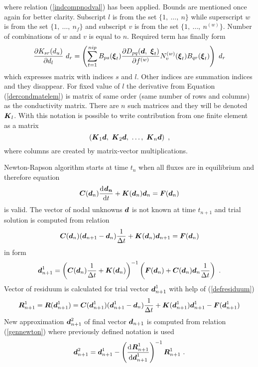 \documentclass[12pt]{book}
\newcommand{\mbf}[1]{\mbox{\boldmath$#1$}}
\newcommand{\del}[2]{\mbox{$\displaystyle\frac{#1}{#2}$}}
\newcommand{\ppd}[2]{\del{\partial{#1}}{\partial{#2}}}
\newcommand{\od}[2]{\del{{\rm d}\>\!{#1}}{{\rm d}{#2}}}
\begin{document}
where relation (\ref{indcompnodval}) has been applied. Bounds are mentioned once again for better clarity. Subscript $l$ is
from the set $\{1,\ \ldots,\ n\}$ while superscript $w$ is from the set $\{1,\ \ldots,\ n_f\}$ and subscript $v$ is from
the set $\{1,\ \ldots,\ n^{(w)}\}$. Number of combinations of $w$ and $v$ is equal to $n$.
Required term has finally form
\begin{eqnarray}
\ppd{K_{sr}(d_u)}{d_l}\ d_r =
\left(\sum_{t=1}^{nip} B_{ps}(\mbf{\xi}_{t}) \ppd{D_{pq}(\mbf{d},\ \mbf{\xi}_{t})}{f^{(w)}}
N^{(w)}_{v}(\mbf{\xi}_{t}) B_{qr}(\mbf{\xi}_{t})\right)\ d_r
\end{eqnarray}
which expresses matrix with indices $s$ and $l$. Other indices are summation indices and they disappear.
For fixed value of $l$ the derivative from Equation (\ref{dercondmatelem}) is matrix of same order
(same number of rows and columns) as the conductivity matrix. There are $n$ such matrices and they will be denoted
$\mbf{K}_{l}$. With this notation is possible to write contribution from one finite element as a matrix
\begin{equation}
\left(\mbf{K}_{1} \mbf{d},\ \mbf{K}_{2} \mbf{d},\ \ldots,\ \mbf{K}_{n} \mbf{d}\right)\ ,
\end{equation}
where columns are created by matrix-vector multiplications.

Newton-Rapson algorithm starts at time $t_n$ when all fluxes are in equilibrium and therefore equation
\begin{equation}
\mbf{C}(\mbf{d}_{n}) \od{\mbf{d_{n}}}{t} + \mbf{K}(\mbf{d}_{n}) \mbf{d}_{n} = \mbf{F}(\mbf{d}_{n})
\end{equation}
is valid. The vector of nodal unknowns $\mbf{d}$ is not known at time $t_{n+1}$ and trial solution
is computed from relation
\begin{equation}
\mbf{C}(\mbf{d}_{n}) (\mbf{d}_{n+1} - \mbf{d}_{n})\del{1}{\Delta t} + \mbf{K}(\mbf{d}_{n}) \mbf{d}_{n+1} = \mbf{F}(\mbf{d}_{n})
\end{equation}
in form
\begin{equation}
\mbf{d}_{n+1}^{1} = \left(\mbf{C}(\mbf{d}_{n}) \del{1}{\Delta t} + \mbf{K}(\mbf{d}_{n})\right)^{-1} 
\left(\mbf{F}(\mbf{d}_{n}) + \mbf{C}(\mbf{d}_{n})\mbf{d}_{n}\del{1}{\Delta t}\right)\ .
\end{equation}
Vector of residuum is calculated for trial vector $\mbf{d}_{n+1}^{1}$ with help of (\ref{defresiduum})
\begin{equation}
\mbf{R}_{n+1}^{1} = \mbf{R}(\mbf{d}_{n+1}^{1}) =
\mbf{C}(\mbf{d}_{n+1}^{1}) (\mbf{d}_{n+1}^{1} - \mbf{d}_{n})\del{1}{\Delta t} +
\mbf{K}(\mbf{d}_{n+1}^{1}) \mbf{d}_{n+1}^{1} - \mbf{F}(\mbf{d}_{n+1}^{1})
\end{equation}
New approximation $\mbf{d}_{n+1}^{2}$ of final vector $\mbf{d}_{n+1}$ is computed from relation (\ref{gennewton})
where previously defined notation is used
\begin{equation}
\mbf{d}_{n+1}^{2} = \mbf{d}_{n+1}^{1} - \left(\od{\mbf{R}_{n+1}^{1}}{\mbf{d}_{n+1}^{1}}\right)^{-1}
\mbf{R}_{n+1}^{1}\ .
\end{equation}
\end{document}
